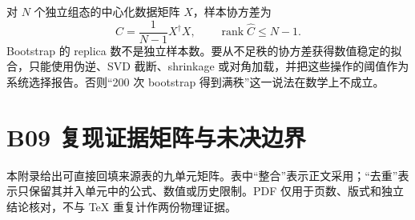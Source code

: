 对 \(N\) 个独立组态的中心化数据矩阵 \(X\)，样本协方差为
\begin{equation}
  \widehat C=\frac{1}{N-1}X^\dagger X,
  \qquad
  \operatorname{rank}\widehat C\le N-1.
  \label{eq:app-rank}
\end{equation}
Bootstrap 的 replica 数不是独立样本数。要从不足秩的协方差获得数值稳定的拟合，只能使用伪逆、SVD 截断、shrinkage 或对角加载，并把这些操作的阈值作为系统选择报告。否则“200 次 bootstrap 得到满秩”这一说法在数学上不成立。

\chapter{B09 复现证据矩阵与未决边界}
\label{app:b09-evidence}

本附录给出可直接回填来源表的九单元矩阵。表中“整合”表示正文采用；“去重”表示只保留其并入单元中的公式、数值或历史限制。PDF 仅用于页数、版式和独立结论核对，不与 TeX 重复计作两份物理证据。

